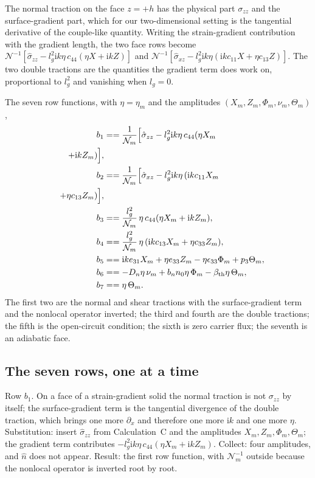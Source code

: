 \documentclass[11pt]{article}
\makeatletter
\newif\ifshowworked
\newenvironment{worked}{%
  \ifshowworked\par\smallskip\noindent\textit{Working.}\par\smallskip\else
  \setbox\z@\vbox\bgroup\fi}{\ifshowworked\par\smallskip\else\egroup\fi}
\newcommand{\ii}{\mathrm{i}}
\newcommand{\Ncal}{\mathcal{N}}
\makeatother
\begin{document}
\begin{worked}
The normal traction on the face $z=+h$ has the physical part $\sigma_{zz}$ and the surface-gradient part,
which for our two-dimensional setting is the tangential derivative of the couple-like quantity. Writing
the strain-gradient contribution with the gradient length, the two face rows become
$\Ncal^{-1}[\hat\sigma_{zz}-l_g^2\ii k\eta\,c_{44}(\eta X+\ii kZ)]$ and
$\Ncal^{-1}[\hat\sigma_{xz}-l_g^2\ii k\eta(\ii k c_{11}X+\eta c_{13}Z)]$. The two double tractions are
the quantities the gradient term does work on, proportional to $l_g^2$ and vanishing when $l_g=0$.
\end{worked}

The seven row functions, with $\eta=\eta_m$ and the amplitudes $(X_m,Z_m,\Phi_m,\nu_m,\Theta_m)$,
\begin{align}
b_1&==\frac{1}{\Ncal_m}\Bigl[\hat\sigma_{zz}-l_g^2\ii k\eta\,c_{44}(\eta X_m \\
\quad +\ii kZ_m)\Bigr], \\
b_2&==\frac{1}{\Ncal_m}\Bigl[\hat\sigma_{xz}-l_g^2\ii k\eta\,(\ii k c_{11}X_m \\
\quad +\eta c_{13}Z_m)\Bigr], \\
b_3&==\frac{l_g^2}{\Ncal_m}\,\eta\,c_{44}(\eta X_m+\ii kZ_m), \\
b_4&==\frac{l_g^2}{\Ncal_m}\,\eta\,(\ii k c_{13}X_m+\eta c_{33}Z_m), \\
b_5&==\ii k e_{31}X_m+\eta e_{33}Z_m-\eta\epsilon_{33}\Phi_m+p_3\Theta_m, \\
b_6&==-D_n\eta\,\nu_m+b_nn_0\eta\,\Phi_m-\beta_{\rm th}\eta\,\Theta_m, \\
b_7&==\eta\,\Theta_m .
\end{align}
The first two are the normal and shear tractions with the surface-gradient term and the nonlocal operator
inverted; the third and fourth are the double tractions; the fifth is the open-circuit condition; the
sixth is zero carrier flux; the seventh is an adiabatic face.

\subsection*{The seven rows, one at a time}

\begin{worked}
Row $b_1$. On a face of a strain-gradient solid the normal traction is not $\sigma_{zz}$ by itself; the
surface-gradient term is the tangential divergence of the double traction, which brings one more
$\partial_x$ and therefore one more $\ii k$ and one more $\eta$. Substitution: insert
$\hat\sigma_{zz}$ from Calculation~C and the amplitudes $X_m,Z_m,\Phi_m,\Theta_m$; the gradient term
contributes $-l_g^2\ii k\eta\,c_{44}(\eta X_m+\ii kZ_m)$. Collect: four amplitudes, and $\hat n$ does not
appear. Result: the first row function, with $\Ncal_m^{-1}$ outside because the nonlocal operator is
inverted root by root.
\end{worked}
\end{document}
